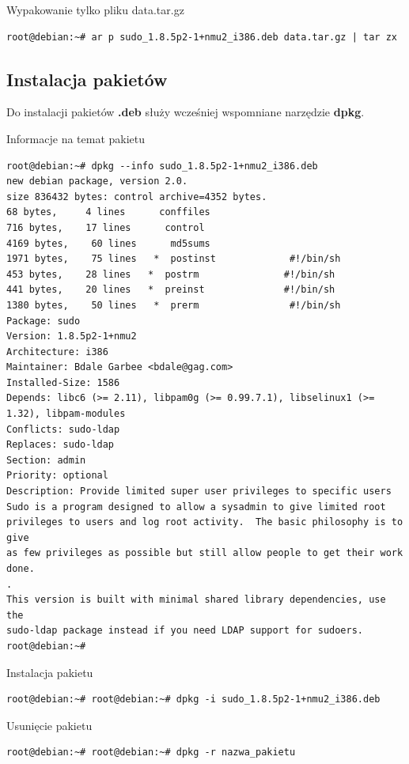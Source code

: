 \newline
\newline
Wypakowanie tylko pliku data.tar.gz
\begin{lstlisting}
root@debian:~# ar p sudo_1.8.5p2-1+nmu2_i386.deb data.tar.gz | tar zx
\end{lstlisting}

\subsection{Instalacja pakietów}

Do instalacji pakietów \textbf{.deb} służy wcześniej wspomniane narzędzie \textbf{dpkg}.
\newline

Informacje na temat pakietu
\begin{lstlisting}
root@debian:~# dpkg --info sudo_1.8.5p2-1+nmu2_i386.deb 
new debian package, version 2.0.
size 836432 bytes: control archive=4352 bytes.
68 bytes,     4 lines      conffiles            
716 bytes,    17 lines      control              
4169 bytes,    60 lines      md5sums              
1971 bytes,    75 lines   *  postinst             #!/bin/sh
453 bytes,    28 lines   *  postrm               #!/bin/sh
441 bytes,    20 lines   *  preinst              #!/bin/sh
1380 bytes,    50 lines   *  prerm                #!/bin/sh
Package: sudo
Version: 1.8.5p2-1+nmu2
Architecture: i386
Maintainer: Bdale Garbee <bdale@gag.com>
Installed-Size: 1586
Depends: libc6 (>= 2.11), libpam0g (>= 0.99.7.1), libselinux1 (>= 1.32), libpam-modules
Conflicts: sudo-ldap
Replaces: sudo-ldap
Section: admin
Priority: optional
Description: Provide limited super user privileges to specific users
Sudo is a program designed to allow a sysadmin to give limited root
privileges to users and log root activity.  The basic philosophy is to give
as few privileges as possible but still allow people to get their work done.
.
This version is built with minimal shared library dependencies, use the
sudo-ldap package instead if you need LDAP support for sudoers.
root@debian:~# 

\end{lstlisting}

\newline
Instalacja pakietu
\begin{lstlisting}
root@debian:~# root@debian:~# dpkg -i sudo_1.8.5p2-1+nmu2_i386.deb 
\end{lstlisting}

\newline
Usunięcie pakietu
\begin{lstlisting}
root@debian:~# root@debian:~# dpkg -r nazwa_pakietu
\end{lstlisting}

